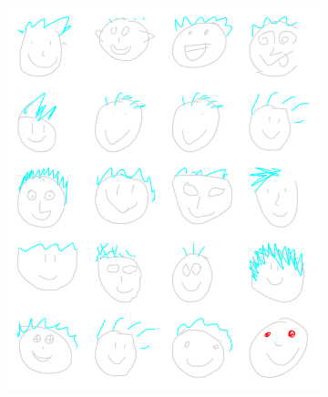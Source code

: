 \begin{figure}[!h]
\begin{subfigure}{.5\textwidth}
\centering
\includegraphics[width=0.9\linewidth]{data_collection/summary/spikyface.png}  
\end{subfigure}
\hspace{5mm}
\begin{subfigure}{.5\textwidth}
\centering

\end{subfigure}
\end{figure}

